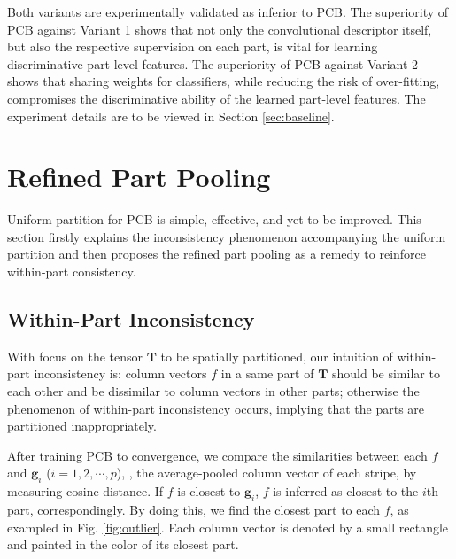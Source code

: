 \documentclass[10pt,twocolumn,letterpaper]{article}
\begin{document}
Both variants are experimentally validated as inferior to PCB. The superiority of PCB against Variant 1 shows that not only the convolutional descriptor itself, but also the respective supervision on each part, is vital for learning discriminative part-level features. The superiority of PCB against Variant 2 shows that sharing weights for classifiers, while reducing the risk of over-fitting, compromises the discriminative ability of the learned part-level features. The experiment details are to be viewed in Section \ref{sec:baseline}. 

\section{Refined Part Pooling}\label{sec:pooling}

Uniform partition for PCB is simple, effective, and yet to be improved. This section firstly explains the inconsistency phenomenon accompanying the uniform partition and then proposes the refined part pooling as a remedy to reinforce within-part consistency.

\subsection{Within-Part Inconsistency}\label{sec:inconsistency}
With focus on the tensor $\bm{T}$ to be spatially partitioned, our intuition of within-part inconsistency is: column vectors $f$ in a same part of $\bm{T}$ should be similar to each other and be dissimilar to column vectors in other parts; otherwise the phenomenon of within-part inconsistency occurs, implying that the parts are partitioned inappropriately. 


After training PCB to convergence, we compare the similarities between each $f$ and $\bm g_i$ ($i=1,2,\cdots,p$), \ie, the average-pooled column vector of each stripe, by measuring cosine distance. If $f$ is closest to $\bm g_i$, $f$ is inferred as closest to the $i$th part, correspondingly. By doing this, we find the closest part to each $f$, as exampled in Fig. \ref{fig:outlier}. Each column vector is denoted by a small rectangle and painted in the color of its closest part. 
\end{document}
